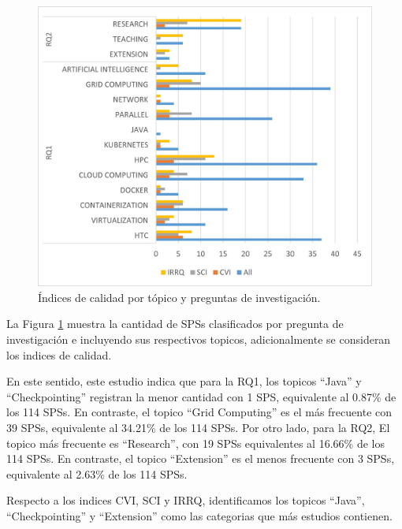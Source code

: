 \begin{figure}[htbp]
	\centering
	\vspace{10pt}
	\includegraphics[scale=0.7]{resources/figures/IndexesByTopicAndRQs.jpg}
	\vspace{6pt}
	\caption{Índices de calidad por tópico y preguntas de investigación.}
	\label{fig:IndexesByTopicAndRQs}
\end{figure}

La Figura \ref{fig:IndexesByTopicAndRQs} muestra la cantidad de SPSs clasificados por pregunta de investigación e incluyendo sus respectivos topicos, adicionalmente se consideran los indices de calidad.

En este sentido, este estudio indica que para la RQ1, los topicos ``Java'' y ``Checkpointing'' registran la menor cantidad con 1 SPS, equivalente al 0.87\% de los 114 SPSs. En contraste, el topico ``Grid Computing'' es el más frecuente con 39 SPSs, equivalente al 34.21\% de los 114 SPSs. Por otro lado, para la RQ2, El topico más frecuente es ``Research'', con 19 SPSs equivalentes al 16.66\% de los 114 SPSs. En contraste, el topico ``Extension'' es el menos frecuente con 3 SPSs, equivalente al 2.63\% de los 114 SPSs.

Respecto a los indices CVI, SCI y IRRQ, identificamos los topicos ``Java'', ``Checkpointing'' y ``Extension'' como las categorias que más estudios contienen.

